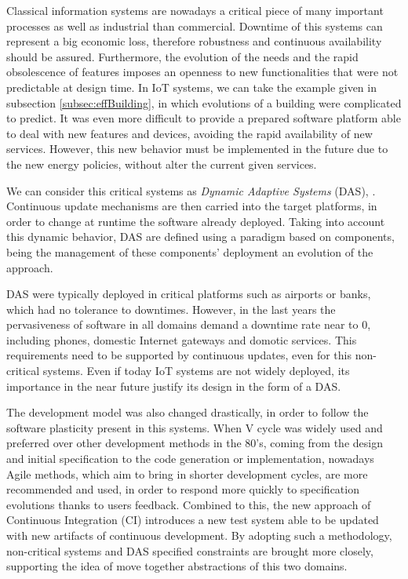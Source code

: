 Classical information systems are nowadays a critical piece of many important processes as well as industrial than commercial.
Downtime of this systems can represent a big economic loss, therefore robustness and continuous availability should be assured.
Furthermore, the evolution of the needs and the rapid obsolescence of features imposes an openness to new functionalities that were not predictable at design time.
In IoT systems, we can take the example given in subsection \ref{subsec:effBuilding}, in which evolutions of a building were complicated to predict.
It was even more difficult to provide a prepared software platform able to deal with new features and devices, avoiding the rapid availability of new services.
However, this new behavior must be implemented in the future due to the new energy policies, without alter the current given services.

We can consider this critical systems as \textit{Dynamic Adaptive Systems} (DAS)\cite{mckinley2004composing}, \cite{morin2009taming}.
Continuous update mechanisms are then carried into the target platforms, in order to change at runtime the software already deployed.
Taking into account this dynamic behavior, DAS are defined using a paradigm based on components, being the management of these components' deployment an evolution of the approach. %

DAS were typically deployed in critical platforms such as airports or banks, which had no tolerance to downtimes.
However, in the last years the pervasiveness of software in all domains demand a downtime rate near to 0, including phones, domestic Internet gateways and domotic services\cite{nain2008using}.
This requirements need to be supported by continuous updates, even for this non-critical systems.
Even if today IoT systems are not widely deployed, its importance in the near future justify its design in the form of a DAS.

The development model was also changed drastically, in order to follow the software plasticity present in this systems.
When V cycle was widely used and preferred over other development methods in the 80's, coming from the design and initial specification to the code generation or implementation, nowadays Agile methods\cite{stolberg2009enabling}, which aim to bring in shorter development cycles, are more recommended and used, in order to respond more quickly to specification evolutions thanks to users feedback.
Combined to this, the new approach of Continuous Integration (CI) introduces a new test system able to be updated with new artifacts of continuous development.
By adopting such a methodology, non-critical systems and DAS specified constraints are brought more closely, supporting the idea of move together abstractions of this two domains.

